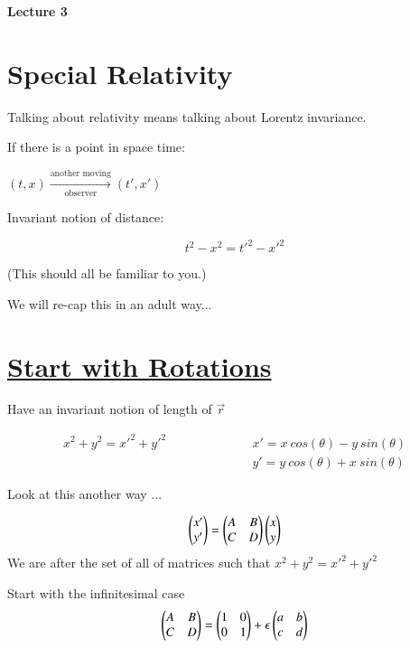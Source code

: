 \thispagestyle{fancy}

\begin{center}
{\huge \textbf{Lecture 3}}
\end{center}

{\fontsize{14}{16}\selectfont


\section*{Special Relativity}

Talking about relativity means talking about Lorentz invariance.

If there is a point in space time: \\
\begin{center}
$(t,x) \xrightarrow[\text{observer}]{\text{another moving}} (t', x')$
\end{center}

Invariant notion of distance:
 
\begin{equation*}
t^2 - x^2 = t'^2 - x'^2
\end{equation*}

(This should all be familiar to you.)

We will re-cap this in an adult way...

\section*{\underline{Start with Rotations}}

Have an invariant notion of length of $\vec{r}$

\begin{eqnarray*}
x^2 + y^2 = x'^2 + y'^2  \hspace{1in} & x' = x\ cos(\theta) - y\ sin(\theta) \\
                          &  y' = y\ cos(\theta) + x\ sin(\theta)
\end{eqnarray*}

Look at this another way ... 

\begin{equation*}
\begin{pmatrix} x' \\ y' \end{pmatrix} = \begin{pmatrix} A & B \\ C & D \end{pmatrix} \begin{pmatrix} x \\ y \end{pmatrix}  
\end{equation*}
We are after the set of all of matrices such that  $x^2 + y^2 = x'^2 + y'^2$

Start with the infinitesimal case
\begin{equation*}
\begin{pmatrix} A & B \\ C & D \end{pmatrix} = \begin{pmatrix} 1 &  0  \\ 0 & 1 \end{pmatrix} + \epsilon \begin{pmatrix} a & b  \\ c & d \end{pmatrix}
\end{equation*}

}
